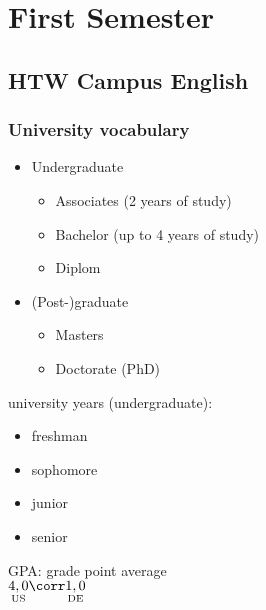 \newcommand{\customDir}{../}




\setCustomSignature{\footnotesize{\textcolor{darkgray}{Notes by\\ \customAuthor}}}	%
\setCustomTitleAuthor{\textcolor{darkgray}{Notes by \customAuthor}}	%




%



\maketitle
\newpage
\tableofcontents
\newpage

\chapter{First Semester}

\section{HTW Campus English}

\subsection*{University vocabulary}
\begin{itemize}
\item Undergraduate
\begin{itemize}[label=$\rightarrow$]
\item Associates (2 years of study)
\item Bachelor (up to 4 years of study)
\item Diplom
\end{itemize}
\item (Post-)graduate
\begin{itemize}[label=$\rightarrow$]
\item Masters
\item Doctorate (PhD)
\end{itemize}
\end{itemize}
university years (undergraduate):
\begin{itemize}
\item freshman
\item sophomore
\item junior
\item senior
\end{itemize}
GPA: grade point average\\
$\underset{\text{US}}{4,0}\corr \underset{\text{DE}}{1,0} $
